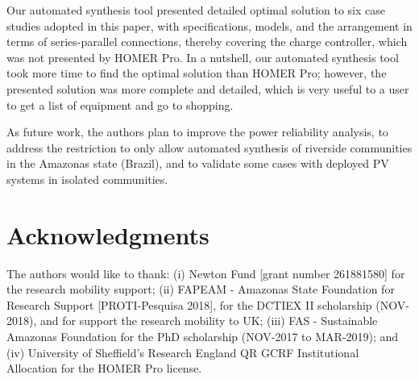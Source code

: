 \documentclass[review]{elsarticle}
\begin{document}
Our automated synthesis tool presented detailed optimal solution 
to six case studies adopted in this paper, with specifications, 
models, and the arrangement in terms of series-parallel connections, 
thereby covering the charge controller, which was not presented by HOMER Pro. 
In a nutshell, our automated synthesis tool took more time 
to find the optimal solution than HOMER Pro; however, the presented 
solution was more complete and detailed, which is very useful 
to a user to get a list of equipment and go to shopping.

As future work, the authors plan to improve the power reliability analysis, 
to address the restriction to only allow automated synthesis of 
riverside communities in the Amazonas state (Brazil), and to 
validate some cases with deployed PV systems in isolated communities.

\section*{Acknowledgments}
The authors would like to thank: (i) Newton Fund [grant number 261881580] for the research mobility support; (ii) FAPEAM - Amazonas State Foundation for Research Support [PROTI-Pesquisa 2018], for the DCTIEX II scholarship (NOV-2018), and for support the research mobility to UK; (iii) FAS - Sustainable Amazonas Foundation for the PhD scholarship (NOV-2017 to MAR-2019); and (iv) University of Sheffield's Research England QR GCRF Institutional Allocation for the HOMER Pro license.

%
{}
\end{document}

